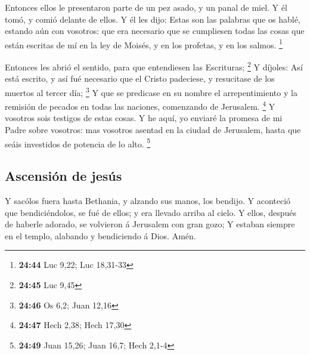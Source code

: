  Entonces ellos le presentaron parte de un pez asado, y un
panal de miel.  Y él tomó, y comió delante de ellos.
 Y él les dijo: Estas son las palabras que os hablé,
estando aún con vosotros: que era necesario que se cumpliesen todas las
cosas que están escritas de mí en la ley de Moisés, y en los profetas, y
en los salmos. \footnote{\textbf{24:44} Luc 9,22; Luc 18,31-33}

 Entonces les abrió el sentido, para que entendiesen las
Escrituras; \footnote{\textbf{24:45} Luc 9,45}  Y díjoles:
Así está escrito, y así fué necesario que el Cristo padeciese, y
resucitase de los muertos al tercer día; \footnote{\textbf{24:46} Os
  6,2; Juan 12,16}  Y que se predicase en su nombre el
arrepentimiento y la remisión de pecados en todas las naciones,
comenzando de Jerusalem. \footnote{\textbf{24:47} Hech 2,38; Hech 17,30}
 Y vosotros sois testigos de estas cosas.  Y
he aquí, yo enviaré la promesa de mi Padre sobre vosotros: mas vosotros
asentad en la ciudad de Jerusalem, hasta que seáis investidos de
potencia de lo alto. \footnote{\textbf{24:49} Juan 15,26; Juan 16,7;
  Hech 2,1-4}

\hypertarget{ascensiuxf3n-de-jesuxfas}{%
\subsection{Ascensión de jesús}\label{ascensiuxf3n-de-jesuxfas}}

 Y sacólos fuera hasta Bethania, y alzando sus manos, los
bendijo.  Y aconteció que bendiciéndolos, se fué de ellos;
y era llevado arriba al cielo.  Y ellos, después de haberle
adorado, se volvieron á Jerusalem con gran gozo;  Y estaban
siempre en el templo, alabando y bendiciendo á Dios. Amén.
